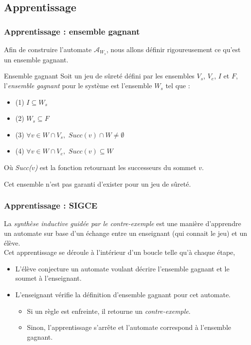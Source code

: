 \documentclass{beamer}
\begin{document}
\subsection{Apprentissage}
\begin{frame}
\frametitle{Apprentissage : ensemble gagnant}
Afin de construire l'automate $\mathcal{A}_{W_s}$, nous allons définir rigoureusement ce qu'est un ensemble gagnant.

\begin{block}{Ensemble gagnant}
Soit un jeu de sûreté défini par les ensembles $V_s$, $V_e$, $I$ et $F$, l'\emph{ensemble gagnant} pour le système est l'ensemble $W_s$ tel que :
\begin{itemize}
\item (1) $I\subseteq W_s$ 
\item (2) $W_s\subseteq F$
\item (3) $\forall v\in W\cap V_s,$ $Succ(v)\cap W\neq\emptyset$ 
\item (4) $\forall v\in W\cap V_e,$ $Succ(v)\subseteq W$
\end{itemize}
Où \emph{Succ($v$)} est la fonction retournant les successeurs du sommet $v$.\\
\end{block}
Cet ensemble n'est pas garanti d'exister pour un jeu de sûreté.
\end{frame}

\begin{frame}
\frametitle{Apprentissage : SIGCE} %
La \emph{synthèse inductive guidée par le contre-exemple} est une manière d'apprendre un automate sur base d'un échange entre un enseignant (qui connait le jeu) et un élève.\\[3mm]

Cet apprentissage se déroule à l'intérieur d'un boucle telle qu'à chaque étape,
\begin{itemize}
\item L'élève conjecture un automate voulant décrire l'ensemble gagnant et le soumet à l'enseignant.
\item L'enseignant vérifie la définition d'ensemble gagnant pour cet automate.
\begin{itemize}
\item Si un règle est enfreinte, il retourne un \emph{contre-exemple}.
\item Sinon, l'apprentissage s'arrête et l'automate correspond à l'ensemble gagnant.
\end{itemize}
\end{itemize}

\end{frame}
\end{document}
